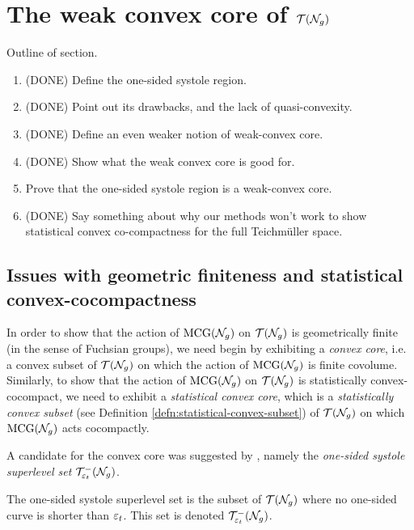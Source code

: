 \documentclass[12pt, reqno]{amsart}
\begin{document}
\section{The weak convex core of $\mathcal{T}(\mathcal{N}_g)$}
\label{sec:weak-convex-core}

Outline of section.
\begin{enumerate}[(1)]
\item (DONE) Define the one-sided systole region.
\item (DONE) Point out its drawbacks, and the lack of quasi-convexity.
\item (DONE) Define an even weaker notion of weak-convex core.
\item (DONE) Show what the weak convex core is good for.
\item Prove that the one-sided systole region is a weak-convex core.
\item (DONE) Say something about why our methods won't work to show statistical convex co-compactness for the full Teichmüller space.
\end{enumerate}

\subsection{Issues with geometric finiteness and statistical convex-cocompactness}
\label{sec:issu-with-geom}

In order to show that the action of $\mathrm{MCG}(\mathcal{N}_g)$ on $\mathcal{T}(\mathcal{N}_g)$ is geometrically finite (in the sense of Fuchsian groups), we need begin by exhibiting a \emph{convex core}, i.e. a convex subset of $\mathcal{T}(\mathcal{N}_g)$ on which the action of $\mathrm{MCG}(\mathcal{N}_g)$ is finite covolume.
Similarly, to show that the action of $\mathrm{MCG}(\mathcal{N}_g)$ on $\mathcal{T}(\mathcal{N}_g)$ is statistically convex-cocompact, we need to exhibit a \emph{statistical convex core}, which is a \emph{statistically convex subset} (see Definition \ref{defn:statistical-convex-subset}) of $\mathcal{T}(\mathcal{N}_g)$ on which $\mathrm{MCG}(\mathcal{N}_g)$ acts cocompactly.

A candidate for the convex core was suggested by \textcite{gendulphe2017whats}, namely the \emph{one-sided systole superlevel set} $\mathcal{T}_{\varepsilon_t}^{-}(\mathcal{N}_g)$.

\begin{definition}
  The one-sided systole superlevel set is the subset of $\mathcal{T}(\mathcal{N}_g)$ where no one-sided curve is shorter than $\varepsilon_t$. This set is denoted $\mathcal{T}_{\varepsilon_t}^{-}(\mathcal{N}_g)$.
\end{definition}
\end{document}
